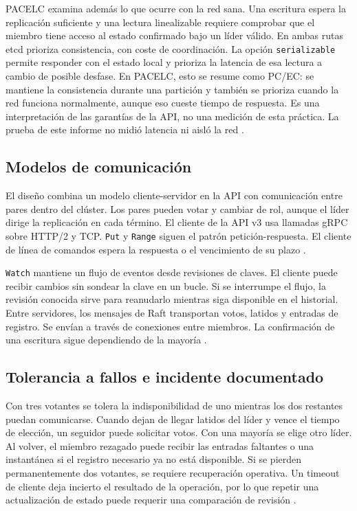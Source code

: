 \documentclass[11pt,a4paper]{article}
\begin{document}
PACELC examina además lo que ocurre con la red sana. Una escritura espera la replicación suficiente y una lectura linealizable requiere comprobar que el miembro tiene acceso al estado confirmado bajo un líder válido. En ambas rutas etcd prioriza consistencia, con coste de coordinación. La opción \texttt{serializable} permite responder con el estado local y prioriza la latencia de esa lectura a cambio de posible desfase. En PACELC, esto se resume como PC/EC: se mantiene la consistencia durante una partición y también se prioriza cuando la red funciona normalmente, aunque eso cueste tiempo de respuesta. Es una interpretación de las garantías de la API, no una medición de esta práctica. La prueba de este informe no midió latencia ni aisló la red \cite{etcdgar,vansteen2023}.

\subsection{Modelos de comunicación}
El diseño combina un modelo cliente-servidor en la API con comunicación entre pares dentro del clúster. Los pares pueden votar y cambiar de rol, aunque el líder dirige la replicación en cada término. El cliente de la API v3 usa llamadas gRPC sobre HTTP/2 y TCP. \texttt{Put} y \texttt{Range} siguen el patrón petición-respuesta. El cliente de línea de comandos espera la respuesta o el vencimiento de su plazo \cite{etcdapi,etcdclient}.

\texttt{Watch} mantiene un flujo de eventos desde revisiones de claves. El cliente puede recibir cambios sin sondear la clave en un bucle. Si se interrumpe el flujo, la revisión conocida sirve para reanudarlo mientras siga disponible en el historial. Entre servidores, los mensajes de Raft transportan votos, latidos y entradas de registro. Se envían a través de conexiones entre miembros. La confirmación de una escritura sigue dependiendo de la mayoría \cite{etcdapi,etcdgar,etcdfail}.

\subsection{Tolerancia a fallos e incidente documentado}
Con tres votantes se tolera la indisponibilidad de uno mientras los dos restantes puedan comunicarse. Cuando dejan de llegar latidos del líder y vence el tiempo de elección, un seguidor puede solicitar votos. Con una mayoría se elige otro líder. Al volver, el miembro rezagado puede recibir las entradas faltantes o una instantánea si el registro necesario ya no está disponible. Si se pierden permanentemente dos votantes, se requiere recuperación operativa. Un timeout de cliente deja incierto el resultado de la operación, por lo que repetir una actualización de estado puede requerir una comparación de revisión \cite{etcdfail,etcdgar,etcdrecovery}.
\end{document}
